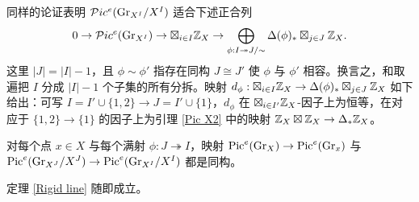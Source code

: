 同样的论证表明 ${\mathcal P} ic^e({\operatorname{Gr}}_{X^I}/X^I)$ 适合下述正合列
\[0\to {\mathcal P} ic^e({\operatorname{Gr}}_{X^I})\to \boxtimes_{i\in I}{\mathbb Z}_X\to \bigoplus_{\phi:I\twoheadrightarrow J/\sim}\Delta(\phi)_*\boxtimes_{j\in J}{\mathbb Z}_X.\]
这里 $|J|=|I|-1$，且 $\phi\sim \phi'$ 指存在同构 $J\cong J'$ 使 $\phi$ 与 $\phi'$ 相容。换言之，和取遍把 $I$ 分成 $|I|-1$ 个子集的所有分拆。映射 $d_{\phi}:\boxtimes_{i\in I}{\mathbb Z}_X\to \Delta(\phi)_*\boxtimes_{j\in J}{\mathbb Z}_X$ 如下给出：可写 $I=I'\cup\{1,2\}\to J=I'\cup\{1\}$，$d_\phi$ 在 $\boxtimes_{i\in I'}{\mathbb Z}_X$-因子上为恒等，在对应于 $\{1,2\}\to\{1\}$ 的因子上为引理 \ref{Pic X2} 中的映射 ${\mathbb Z}_X\boxtimes{\mathbb Z}_X\to \Delta_*{\mathbb Z}_X$。

\begin{cor}
对每个点 $x\in X$ 与每个满射 $\phi: J\twoheadrightarrow I$，映射 ${\operatorname{Pic}}^e({\operatorname{Gr}}_X)\to {\operatorname{Pic}}^e({\operatorname{Gr}}_x)$ 与 ${\operatorname{Pic}}^e({\operatorname{Gr}}_{X^J}/X^J)\to{\operatorname{Pic}}^e({\operatorname{Gr}}_{X^I}/X^I)$ 都是同构。
\end{cor}

定理 \ref{Rigid line} 随即成立。
